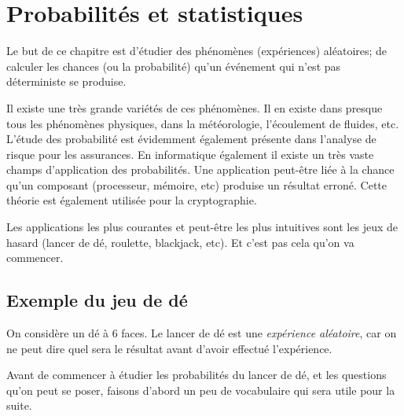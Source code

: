 \documentclass[a4paper,12pt]{book}
\begin{document}
\chapter{Probabilités et statistiques}

Le but de ce chapitre est d'étudier des phénomènes (expériences) aléatoires; 
de calculer les chances (ou la probabilité) qu'un événement 
qui n'est pas déterministe se produise.

Il existe une très grande variétés de ces phénomènes. Il en existe 
dans presque tous les phénomènes physiques, dans la météorologie, 
l'écoulement de fluides, etc. L'étude des probabilité est évidemment également présente 
dans l'analyse de risque pour les assurances. 
En informatique également il existe un très vaste champs d'application des probabilités.
Une application peut-être liée à la chance qu'un composant (processeur, mémoire, etc) 
produise un résultat erroné. Cette théorie est également utilisée pour la cryptographie. 

Les applications les plus courantes et peut-être les 
plus intuitives sont les jeux de hasard (lancer de dé, roulette, blackjack, etc).
Et c'est pas cela qu'on va commencer. 

\section{Exemple du jeu de dé}

On considère un dé à 6 faces. Le lancer de dé est une \textit{expérience aléatoire}, car
on ne peut dire quel sera le résultat avant d'avoir effectué l'expérience. 

Avant de commencer à étudier les probabilités du lancer de dé, et les questions qu'on peut se poser, faisons d'abord un peu de vocabulaire
qui sera utile pour la suite.
\end{document}
